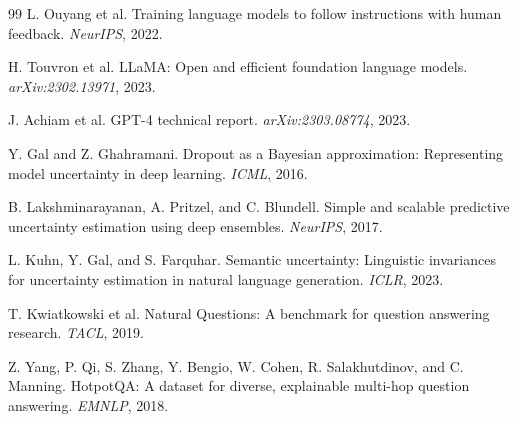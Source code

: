 \documentclass[11pt]{article}
\begin{document}
\begin{thebibliography}{99}
L. Ouyang et al. Training language models to follow instructions with human feedback. \textit{NeurIPS}, 2022.

H. Touvron et al. LLaMA: Open and efficient foundation language models. \textit{arXiv:2302.13971}, 2023.

J. Achiam et al. GPT-4 technical report. \textit{arXiv:2303.08774}, 2023.

Y. Gal and Z. Ghahramani. Dropout as a Bayesian approximation: Representing model uncertainty in deep learning. \textit{ICML}, 2016.

B. Lakshminarayanan, A. Pritzel, and C. Blundell. Simple and scalable predictive uncertainty estimation using deep ensembles. \textit{NeurIPS}, 2017.

L. Kuhn, Y. Gal, and S. Farquhar. Semantic uncertainty: Linguistic invariances for uncertainty estimation in natural language generation. \textit{ICLR}, 2023.

T. Kwiatkowski et al. Natural Questions: A benchmark for question answering research. \textit{TACL}, 2019.

Z. Yang, P. Qi, S. Zhang, Y. Bengio, W. Cohen, R. Salakhutdinov, and C. Manning. HotpotQA: A dataset for diverse, explainable multi-hop question answering. \textit{EMNLP}, 2018.

\end{thebibliography}
\end{document}
